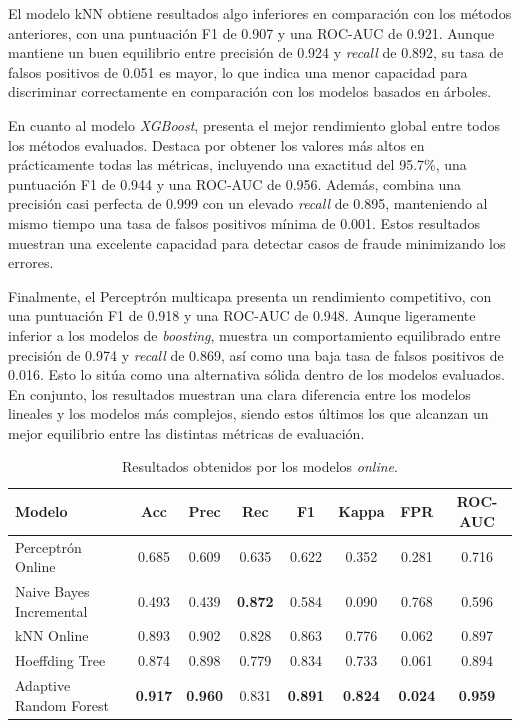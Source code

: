 \documentclass[12pt,a4paper]{report}
\begin{document}
El modelo kNN obtiene resultados algo inferiores en comparación con los métodos anteriores, con una puntuación F1 de 0.907 y una ROC-AUC de 0.921. Aunque mantiene un buen equilibrio entre precisión de 0.924 y \emph{recall} de 0.892, su tasa de falsos positivos de 0.051 es mayor, lo que indica una menor capacidad para discriminar correctamente en comparación con los modelos basados en árboles.

En cuanto al modelo \emph{XGBoost}, presenta el mejor rendimiento global entre todos los métodos evaluados. Destaca por obtener los valores más altos en prácticamente todas las métricas, incluyendo una exactitud del 95.7\%, una puntuación F1 de 0.944 y una ROC-AUC de 0.956. Además, combina una precisión casi perfecta de 0.999 con un elevado \emph{recall} de 0.895, manteniendo al mismo tiempo una tasa de falsos positivos mínima de 0.001. Estos resultados muestran una excelente capacidad para detectar casos de fraude minimizando los errores.

Finalmente, el Perceptrón multicapa presenta un rendimiento competitivo, con una puntuación F1 de 0.918 y una ROC-AUC de 0.948. Aunque ligeramente inferior a los modelos de \emph{boosting}, muestra un comportamiento equilibrado entre precisión de 0.974 y \emph{recall} de 0.869, así como una baja tasa de falsos positivos de 0.016. Esto lo sitúa como una alternativa sólida dentro de los modelos evaluados. En conjunto, los resultados muestran una clara diferencia entre los modelos lineales y los modelos más complejos, siendo estos últimos los que alcanzan un mejor equilibrio entre las distintas métricas de evaluación.

\begin{table}[H]
\centering
\caption{Resultados obtenidos por los modelos \emph{online}.}
\begin{tabular}{lccccccc}
\hline
\textbf{Modelo} & \textbf{Acc} & \textbf{Prec} & \textbf{Rec} & \textbf{F1} & \textbf{Kappa} & \textbf{FPR} & \textbf{ROC-AUC} \\
\hline
Perceptrón Online & 0.685 & 0.609 & 0.635 & 0.622 & 0.352 & 0.281 & 0.716 \\
Naive Bayes Incremental & 0.493 & 0.439 & \textbf{0.872} & 0.584 & 0.090 & 0.768 & 0.596 \\
kNN Online & 0.893 & 0.902 & 0.828 & 0.863 & 0.776 & 0.062 & 0.897 \\
Hoeffding Tree & 0.874 & 0.898 & 0.779 & 0.834 & 0.733 & 0.061 & 0.894 \\
Adaptive Random Forest & \textbf{0.917} & \textbf{0.960} & 0.831 & \textbf{0.891} & \textbf{0.824} & \textbf{0.024} & \textbf{0.959} \\
\hline
\end{tabular}
\label{tab:resultados_online}
\end{table}
\end{document}
